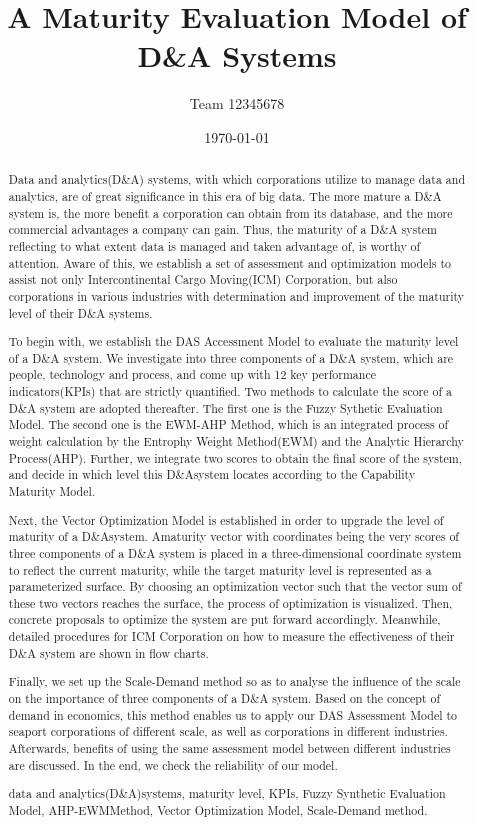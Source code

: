 \documentclass{mcmthesis}  %
\title{ A Maturity Evaluation Model of D\&A Systems}  %
\author{\small Team 12345678}  %
\date{\today}  %
\begin{document}
	\begin{abstract}  %
		
		Data and analytics(D\&A) systems, with which corporations utilize to manage data and analytics, are of great significance in this era of big data. The more mature a D\&A system is, the more benefit a corporation can obtain from its database, and the more commercial advantages a company can gain. Thus, the maturity of a D\&A system reflecting to what extent data is managed and taken advantage of, is worthy of attention. Aware of this, we establish a set of assessment and optimization models to assist
		not only Intercontinental Cargo Moving(ICM) Corporation, but also corporations in various industries with determination and improvement of the maturity level of their D\&A systems.
		
		To begin with, we establish the DAS Accessment Model to evaluate the maturity level of a D\&A
		system. We investigate into three components of a D\&A system, which are people, technology and
		process, and come up with 12 key performance indicators(KPIs) that are strictly quantified. Two methods to calculate the score of a D\&A system are adopted thereafter. The first one is the Fuzzy Sythetic Evaluation Model. The second one is the EWM-AHP Method, which is an integrated process of weight calculation by the Entrophy Weight Method(EWM) and the Analytic Hierarchy Process(AHP). Further, we integrate two scores to obtain the final score of the system, and decide in which level this
		D\&Asystem locates according to the Capability Maturity Model.
		
		Next, the Vector Optimization Model is established in order to upgrade the level of maturity of a D\&Asystem. Amaturity vector with coordinates being the very scores of three components of a D\&A system is placed in a three-dimensional coordinate system to reflect the current maturity, while the target maturity level is represented as a parameterized surface. By choosing an optimization vector such that the vector sum of these two vectors reaches the surface, the process of optimization is visualized. Then, concrete proposals to optimize the system are put forward accordingly. Meanwhile, detailed procedures for ICM Corporation on how to measure the effectiveness of their D\&A system are shown in flow charts.
		
		Finally, we set up the Scale-Demand method so as to analyse the influence of the scale on the importance of three components of a D\&A system. Based on the concept of demand in economics, this
		method enables us to apply our DAS Assessment Model to seaport corporations of different scale, as well as corporations in different industries. Afterwards, benefits of using the same assessment model between different industries are discussed. In the end, we check the reliability of our model.
		\begin{keywords}  %
			data and analytics(D\&A)systems, maturity level, KPIs, Fuzzy Synthetic Evaluation Model, AHP-EWMMethod, Vector Optimization Model, Scale-Demand method.
		\end{keywords}  %
	\end{abstract}  %
\end{document}
